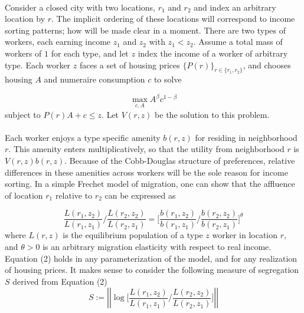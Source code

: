 \documentclass[]{article}
\begin{document}
\paragraph*{}
Consider a closed city with two locations, $r_{1}$ and $r_{2}$ and index an arbitrary location by $r$. The implicit ordering of these locations will correspond to income sorting patterns; how will be made clear in a moment. There are two types of workers, each earning income $z_{1}$ and $z_{2}$ with $z_{1} < z_{2}$. Assume a total mass of workers of $1$ for each type, and let $z$ index the income of a worker of arbitrary type. Each worker $z$ faces a set of housing prices $\{P(r)\}_{r \in \{r_{1}, r_{2}\}}$, and chooses housing $A$ and numeraire consumption $c$ to solve

\begin{equation}
	\max_{c, A} A^{\beta}c^{1-\beta}
\end{equation}
subject to $P(r)A + c \leq z$. Let $V(r, z)$ be the solution to this problem. 

\paragraph*{}
 Each worker enjoys a type specific amenity $b(r, z)$ for residing in neighborhood $r$. This amenity enters multiplicatively, so that the utility from neighborhood $r$ is $V(r, z)b(r, z)$. Because of the Cobb-Douglas structure of preferences, relative differences in these amenities across workers will be the sole reason for income sorting. In a simple Frechet model of migration, one can show that the affluence of location $r_{1}$ relative to $r_{2}$ can be expressed as
 
 \begin{equation}
 	\frac{L(r_{1}, z_{2})}{L(r_{1}, z_{1})}/\frac{L(r_{2}, z_{2})}{L(r_{2}, z_{1})} = \bigg[\frac{b(r_{1}, z_{2})}{b(r_{1}, z_{1})}/\frac{b(r_{2}, z_{2})}{b(r_{2}, z_{1})}\bigg]^{\theta}
 \end{equation}
 where $L(r, z)$ is the equilibrium population of a type $z$ worker in location $r$, and $\theta > 0$ is an arbitrary migration elasticity with respect to real income. Equation (2) holds in any parameterization of the model, and for any realization of housing prices.  It makes sense to consider the following measure of segregation $S$ derived from Equation (2)
 \begin{equation}
 	S := \left|\left|\log\bigg[\frac{L(r_{1}, z_{2})}{L(r_{1}, z_{1})}/\frac{L(r_{2}, z_{2})}{L(r_{2}, z_{1})}\bigg]\right|\right|
 \end{equation}
\end{document}
